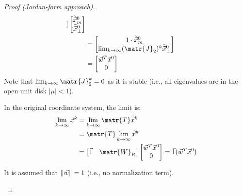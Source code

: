 \begin{subappendices}
\begin{theorem}
\begin{proof}[Proof (Jordan-form approach)]
\[\begin{split}
\begin{bmatrix}
                \end{bmatrix} \begin{bmatrix}
                    \tilde{\x}^0_{m} \\ \tilde{\x}^0_{\bot}
                \end{bmatrix} \\
                &= \begin{bmatrix}
                    1 \cdot \tilde{\x}^0_{m} \\ 
                    \lim_{k \rightarrow \infty} (\matr{J}_2)^k \tilde{\x}^0_{\bot}
                \end{bmatrix} \\
                &= \begin{bmatrix}
                    \w^T \x^0 \\ 
                    0
                \end{bmatrix} \\
            \end{split}
        \]
        Note that $\lim_{k \rightarrow \infty} \matr{J}_2^k = 0$ as it is stable (i.e., all eigenvalues are in the open unit disk $|\mu| < 1$).
    
        In the original coordinate system, the limit is:
        \[
            \begin{split}
                \lim_{k \rightarrow \infty} \x^k 
                &= \lim_{k \rightarrow \infty} \matr{T} \tilde{\x}^k \\
                &= \matr{T} \lim_{k \rightarrow \infty} \tilde{\x}^k \\
                &= \begin{bmatrix}
                    \vec{1} & \matr{W}_R
                \end{bmatrix} \begin{bmatrix}
                    \w^T \x^0 \\ 
                    0
                \end{bmatrix} 
                = \vec{1} (\w^T \x^0)
            \end{split}
        \]
        
        \indenttbox
        \begin{remark}
            It is assumed that $\Vert {\vec{w}} \Vert = 1$ (i.e., no normalization term).
        \end{remark}
    \end{proof}



\end{theorem}
\end{subappendices}
